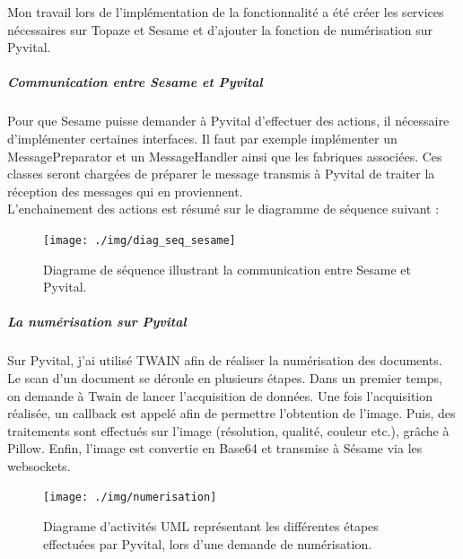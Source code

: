 Mon travail lors de l'implémentation de la fonctionnalité a été créer les services nécessaires sur Topaze et Sesame et d'ajouter la fonction de numérisation sur Pyvital.

\subparagraph*{Communication entre Sesame et Pyvital}
Pour que Sesame puisse demander à Pyvital d'effectuer des actions, il nécessaire d'implémenter certaines interfaces. Il faut par exemple implémenter un MessagePreparator et un MessageHandler ainsi que les fabriques associées. Ces classes seront chargées de préparer le message transmis à Pyvital de traiter la réception des messages qui en proviennent. \\

L'enchainement des actions est résumé sur le diagramme de séquence suivant :

\begin{figure}[H]
  \centering
  \texttt{[image: ./img/diag\_seq\_sesame]}
  \caption{\label{fig:diag_seq_sesame} Diagrame de séquence illustrant la communication entre Sesame et Pyvital.}
\end{figure}

\subparagraph*{La numérisation sur Pyvital}
Sur Pyvital, j'ai utilisé TWAIN afin de réaliser la numérisation des documents. Le scan d'un document se déroule en plusieurs étapes. Dans un premier temps, on demande à Twain de lancer l'acquisition de données. Une fois l'acquisition réalisée, un callback est appelé afin de permettre l'obtention de l'image. Puis, des traitements sont effectués sur l'image (résolution, qualité, couleur etc.), grâche à Pillow. Enfin, l'image est convertie en Base64 et transmise à Sésame via les websockets.
 
\begin{figure}[H]
  \centering
  \texttt{[image: ./img/numerisation]}
  \caption{\label{fig:diag_seq_sesame} Diagrame d'activités UML représentant les différentes étapes effectuées par Pyvital, lors d'une demande de numérisation.}
\end{figure}


		

